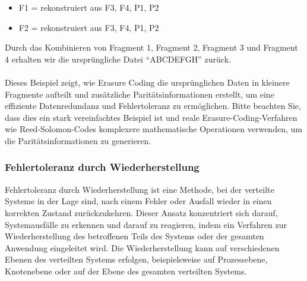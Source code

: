 \documentclass[../vs-script-first-v01.tex]{subfiles}
\begin{document}
\begin{itemize}
\item F1 = rekonstruiert aus F3, F4, P1, P2
\item F2 = rekonstruiert aus F3, F4, P1, P2
\end{itemize}  
Durch das Kombinieren von Fragment 1, Fragment 2, Fragment 3 und Fragment 4 erhalten wir die ursprüngliche Datei \enquote{ABCDEFGH} zurück.
\\\\
Dieses Beispiel zeigt, wie Erasure Coding die ursprünglichen Daten in kleinere Fragmente aufteilt und zusätzliche Paritätsinformationen erstellt, um eine effiziente Datenredundanz und Fehlertoleranz zu ermöglichen. Bitte beachten Sie, dass dies ein stark vereinfachtes Beispiel ist und reale Erasure-Coding-Verfahren wie Reed-Solomon-Codes komplexere mathematische Operationen verwenden, um die Paritätsinformationen zu generieren.

\subsubsection{Fehlertoleranz durch Wiederherstellung}

Fehlertoleranz durch Wiederherstellung ist eine Methode, bei der verteilte Systeme in der Lage sind, nach einem Fehler oder Ausfall wieder in einen korrekten Zustand zurückzukehren. Dieser Ansatz konzentriert sich darauf, Systemausfälle zu erkennen und darauf zu reagieren, indem ein Verfahren zur Wiederherstellung des betroffenen Teils des Systems oder der gesamten Anwendung eingeleitet wird. Die Wiederherstellung kann auf verschiedenen Ebenen des verteilten Systems erfolgen, beispielsweise auf Prozessebene, Knotenebene oder auf der Ebene des gesamten verteilten Systems.
\end{document}
